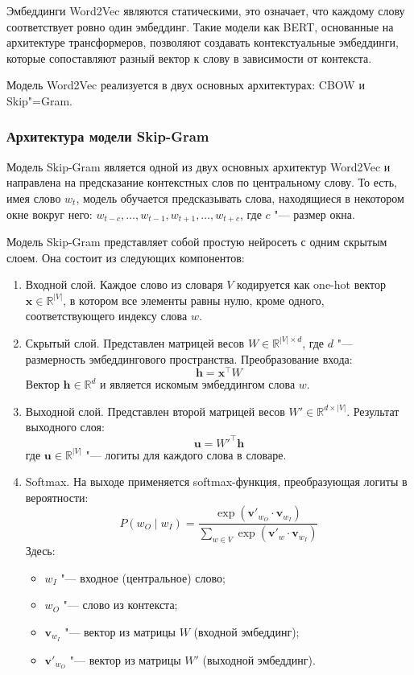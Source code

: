 \documentclass[coursework]{SCWorks}
\begin{document}
Эмбеддинги Word2Vec являются статическими, это означает, что каждому слову соответствует ровно один эмбеддинг. Такие модели как BERT, основанные на архитектуре трансформеров, позволяют создавать контекстуальные эмбеддинги, которые сопоставляют разный вектор к слову в зависимости от контекста\cite{vaswani2017attention}.

Модель Word2Vec реализуется в двух основных архитектурах: CBOW и Skip"=Gram.

\subsubsection{Архитектура модели Skip-Gram}

Модель Skip-Gram является одной из двух основных архитектур Word2Vec и направлена на предсказание контекстных слов по центральному слову. То есть, имея слово $w_t$, модель обучается предсказывать слова, находящиеся в некотором окне вокруг него: $w_{t-c}, \dots, w_{t-1}, w_{t+1}, \dots, w_{t+c}$, где $c$ "--- размер окна\cite{church2017word2vec}.


Модель Skip-Gram представляет собой простую нейросеть с одним скрытым слоем. Она состоит из следующих компонентов:

\begin{enumerate}
  \item Входной слой.
  Каждое слово из словаря $V$ кодируется как one-hot вектор $\mathbf{x} \in \mathbb{R}^{|V|}$, в котором все элементы равны нулю, кроме одного, соответствующего индексу слова $w$.

  \item Скрытый слой.
  Представлен матрицей весов $W \in \mathbb{R}^{|V| \times d}$, где $d$ "--- размерность эмбеддингового пространства. Преобразование входа:
  \[
  \mathbf{h} = \mathbf{x}^\top W
  \]
  Вектор $\mathbf{h} \in \mathbb{R}^d$ и является искомым эмбеддингом слова $w$.

  \item Выходной слой. 
  Представлен второй матрицей весов $W' \in \mathbb{R}^{d \times |V|}$. Результат выходного слоя:
  \[
  \mathbf{u} = W'^\top \mathbf{h}
  \]
  где $\mathbf{u} \in \mathbb{R}^{|V|}$ "--- логиты для каждого слова в словаре.

  \item Softmax.
  На выходе применяется softmax-функция, преобразующая логиты в вероятности:
  \[
  P(w_O \mid w_I) = \frac{\exp(\mathbf{v}'_{w_O} \cdot \mathbf{v}_{w_I})}{\sum_{w \in V} \exp(\mathbf{v}'_w \cdot \mathbf{v}_{w_I})}
  \]
  Здесь:
  \begin{itemize}
    \item $w_I$ "--- входное (центральное) слово;
    \item $w_O$ "--- слово из контекста;
    \item $\mathbf{v}_{w_I}$ "--- вектор из матрицы $W$ (входной эмбеддинг);
    \item $\mathbf{v}'_{w_O}$ "--- вектор из матрицы $W'$ (выходной эмбеддинг).
  \end{itemize}
\end{enumerate}
\end{document}
